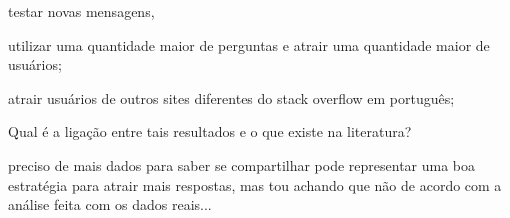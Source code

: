 testar novas mensagens,

utilizar uma quantidade maior de perguntas e atrair uma quantidade maior de usuários;

atrair usuários de outros sites diferentes do stack overflow em português;

Qual é a ligação entre tais resultados e o que existe na literatura?

preciso de mais dados para saber se compartilhar pode representar uma boa estratégia para atrair mais respostas, mas tou achando que não de acordo com a análise feita com os dados reais...
